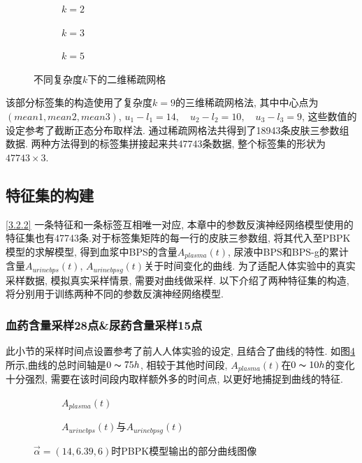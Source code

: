 \documentclass[a4paper,punct=banjiao,twoside]{ctexrep}
\theoremstyle{plain}
\theoremstyle{definition}
\theoremstyle{remark}
\begin{document}
\begin{figure}[H]
  \centering
  \begin{subfigure}{0.32\textwidth}
    \centering
    \resizebox{1\textwidth}{!}{}
    \caption{$k=2$}
  \end{subfigure}
  \begin{subfigure}{0.32\textwidth}
    \centering
    \resizebox{1\textwidth}{!}{}
    \caption{$k=3$}
  \end{subfigure}
  \begin{subfigure}{0.32\textwidth}
    \centering
    \resizebox{1\textwidth}{!}{}
    \caption{$k=5$}
  \end{subfigure}

  \caption{不同复杂度$k$下的二维稀疏网格}
  \label{稀疏网格}
\end{figure}

该部分标签集的构造使用了复杂度$k=9$的三维稀疏网格法, 其中中心点为$(mean1,mean2,mean3)$, $u_1-l_1 = 14,\quad u_2-l_2 = 10,\quad u_3-l_3 = 9$, 这些数值的设定参考了截断正态分布取样法.
通过稀疏网格法共得到了18943条皮肤三参数组数据. 两种方法得到的标签集拼接起来共47743条数据, 整个标签集的形状为$47743\times 3$.

\subsection{特征集的构建}
\ref{3.2.2}
一条特征和一条标签互相唯一对应, 本章中的参数反演神经网络模型使用的特征集也有47743条.对于标签集矩阵的每一行的皮肤三参数组, 将其代入至PBPK模型的求解模型, 得到血浆中BPS的含量$A_{plasma}(t)$, 尿液中BPS和BPS-g的累计含量$A_{urinebps}(t)$, $A_{urinebpsg}(t)$关于时间变化的曲线.
为了适配人体实验中的真实采样数据, 模拟真实采样情景, 需要对曲线做采样. 以下介绍了两种特征集的构造, 将分别用于训练两种不同的参数反演神经网络模型.

\subsubsection*{血药含量采样28点\&尿药含量采样15点}
此小节的采样时间点设置参考了前人人体实验的设定\cite{11,13}, 且结合了曲线的特性.
如图\ref{曲线}所示,曲线的总时间轴是$0\thicksim 75h$, 相较于其他时间段, $A_{plasma}(t)$在$0\thicksim 10h$的变化十分强烈, 需要在该时间段内取样额外多的时间点, 以更好地捕捉到曲线的特征.



\begin{figure}[H]
  \centering
  \begin{subfigure}{0.45\textwidth}
    \centering
    \resizebox{1\textwidth}{!}{}
    \caption{$A_{plasma}(t)$}
    \label{曲线a}
  \end{subfigure}
  \begin{subfigure}{0.45\textwidth}
    \centering
    \resizebox{1\textwidth}{!}{}
    \caption{$A_{urinebps}(t)$与$A_{urinebpsg}(t)$}
    \label{曲线b}
  \end{subfigure}


  \caption{$\vec{\alpha}=(14,6.39,6)$时PBPK模型输出的部分曲线图像}
  \label{曲线}
\end{figure}
\end{document}
